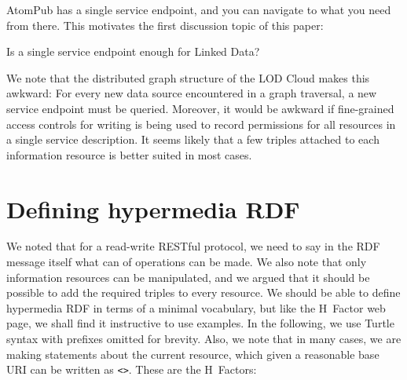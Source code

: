 \documentclass{llncs}
\begin{document}
AtomPub has a single service endpoint,
and you can navigate to what you need from there. This motivates the
first discussion topic of this paper:

\begin{question}
Is a single service endpoint enough for Linked Data?
\end{question}

We note that the distributed graph structure of the LOD Cloud makes
this awkward: For every new data source encountered in a graph
traversal, a new service endpoint must be queried. Moreover, it would
be awkward if fine-grained access controls for writing is being used
to record permissions for all resources in a single service
description. It seems likely that a few triples attached to each
information resource is better suited in most cases.

\section{Defining hypermedia RDF}

We noted that for a read-write RESTful protocol, we need to say in the
RDF message itself what can of operations can be made. We also note
that only information resources can be manipulated, and we argued that
it should be possible to add the required triples to every
resource. We should be able to define hypermedia RDF in terms of a
minimal vocabulary, but like the H~Factor web page, we shall find it
instructive to use examples. In the following, we use Turtle syntax
with prefixes omitted for brevity. Also, we note that in many cases,
we are making statements about the current resource, which given a
reasonable base URI can be written as \texttt{<>}. These are the H~Factors:
\end{document}
